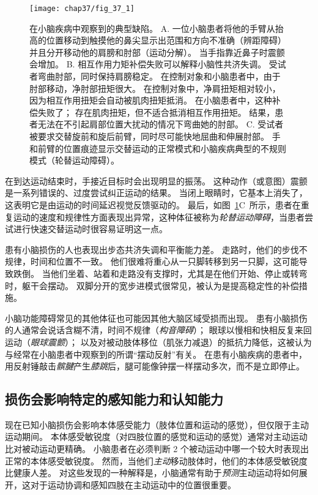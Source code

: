 \begin{figure}[htbp]
	\centering
	\texttt{[image: chap37/fig\_37\_1]}
	\caption{在小脑疾病中观察到的典型缺陷。
		A. 一位小脑患者将他的手臂从抬高的位置移动到触摸他的鼻尖显示出范围和方向不准确（辨距障碍）并且分开移动他的肩膀和肘部（运动分解）。 
		当手指靠近鼻子时震颤会增加。
		B. 相互作用力矩补偿失败可以解释小脑性共济失调。
		受试者弯曲肘部，同时保持肩膀稳定。
		在控制对象和小脑患者中，由于肘部移动，净肘部扭矩很大。
		在控制对象中，净肩扭矩相对较小，因为相互作用扭矩会自动被肌肉扭矩抵消。
		在小脑患者中，这种补偿失败了；
		存在肌肉扭矩，但不适合抵消相互作用扭矩。
		结果，患者无法在不引起肩部位置大扰动的情况下弯曲她的肘部\cite{bastian2000cerebellar}。
		C. 受试者被要求交替旋前和旋后前臂，同时尽可能快地屈曲和伸展肘部。
		手和前臂的位置痕迹显示交替运动的正常模式和小脑疾病典型的不规则模式（轮替运动障碍）。}
	\label{fig:37_1}
\end{figure}


在到达运动结束时，手接近目标时会出现明显的振荡。
这种动作（或意图）震颤是一系列错误的、过度尝试纠正运动的结果。
当闭上眼睛时，它基本上消失了，这表明它是由运动的时间延迟视觉反馈驱动的。
最后，如图~\ref{fig:37_1}C~所示，患者在重复运动的速度和规律性方面表现出异常，这种体征被称为\textit{轮替运动障碍}，当患者尝试进行快速交替运动时很容易证明这一点。


患有小脑损伤的人也表现出步态共济失调和平衡能力差。
走路时，他们的步伐不规律，时间和位置不一致。
他们很难将重心从一只脚转移到另一只脚，这可能导致跌倒。
当他们坐着、站着和走路没有支撑时，尤其是在他们开始、停止或转弯时，躯干会摆动。
双脚分开的宽步进模式很常见，被认为是提高稳定性的补偿措施。


小脑功能障碍常见的其他体征也可能因其他大脑区域受损而出现。
患有小脑损伤的人通常会说话含糊不清，时间不规律（\textit{构音障碍}）；
眼球以慢相和快相反复来回运动（\textit{眼球震颤}）；
以及对被动肢体移位（肌张力减退）的抵抗力降低，这被认为与经常在小脑患者中观察到的所谓“摆动反射”有关。
在患有小脑疾病的患者中，用反射锤敲击\textit{髌腱}产生\textit{膝跳}后，腿可能像钟摆一样摆动多次，而不是立即停止。



\subsection{损伤会影响特定的感知能力和认知能力}

现在已知小脑损伤会影响本体感受能力（肢体位置和运动的感觉），但仅限于主动运动期间。
本体感受敏锐度（对四肢位置的感觉和运动的感觉）通常对主动运动比对被动运动更精确。
小脑患者在必须判断 2 个被动运动中哪一个较大时表现出正常的本体感受敏锐度。
然而，当他们\textit{主动}移动肢体时，他们的本体感受敏锐度比健康人差。
对这些发现的一种解释是，小脑通常有助于\textit{预测}主动运动将如何展开，这对于运动协调和感知四肢在主动运动中的位置很重要。


